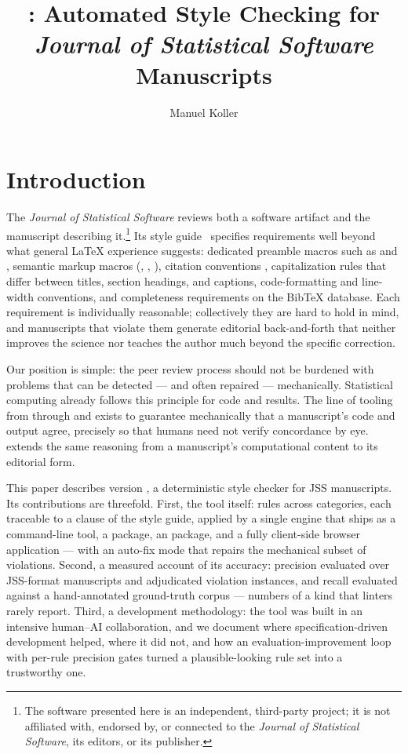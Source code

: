 \documentclass[nojss,article]{jss}
\author{Manuel Koller}
\title{\pkg{jss-lint}: Automated Style Checking for
  \emph{Journal of Statistical Software} Manuscripts}
\providecommand{\BibTeX}{Bib\TeX{}}
\begin{document}
\section{Introduction}
\label{sec:intro}

The \emph{Journal of Statistical Software} reviews both a software
artifact and the manuscript describing it.\footnote{The software presented
here is an independent, third-party project; it is not affiliated
with, endorsed by, or connected to the \emph{Journal of Statistical
Software}, its editors, or its publisher.} Its style
guide~\citep{jss_styleguide} specifies requirements well beyond what
general \LaTeX{} experience suggests: dedicated preamble macros such
as  and
, semantic markup macros
(, ,
),  citation conventions
\citep{natbib}, capitalization rules that differ between titles,
section headings, and captions, code-formatting and line-width
conventions, and completeness requirements on the \BibTeX{} database.
Each requirement is individually reasonable; collectively they are
hard to hold in mind, and manuscripts that violate them generate
editorial back-and-forth that neither improves the science nor teaches
the author much beyond the specific correction.

Our position is simple: the peer review process should not be burdened
with problems that can be detected --- and often repaired ---
mechanically. Statistical computing already follows this principle for
code and results. The line of tooling from 
\citep{leisch2002} through  \citep{xie2014} and
 \citep{sasweave} exists to guarantee mechanically that
a manuscript's code and output agree, precisely so that humans need
not verify concordance by eye.  extends the same
reasoning from a manuscript's computational content to its editorial
form.

This paper describes  version \StatToolVersion{}, a
deterministic style checker for JSS manuscripts. Its contributions are
threefold. First, the tool itself: \StatRuleCount{} rules across
\StatCategoryCount{} categories, each traceable to a clause of the
style guide, applied by a single  engine that ships as
a command-line tool, a  package, an 
package, and a fully client-side browser application --- with an
auto-fix mode that repairs the mechanical subset of violations.
Second, a measured account of its accuracy: precision evaluated over
\StatCorpusSize{} JSS-format manuscripts and \StatPrecisionReviewed{}
adjudicated violation instances, and recall evaluated against a
hand-annotated ground-truth corpus --- numbers of a kind that linters
rarely report. Third, a development methodology: the tool was built
in an intensive human--AI collaboration, and we document where
specification-driven development helped, where it did not, and how an
evaluation-improvement loop with per-rule precision gates turned a
plausible-looking rule set into a trustworthy one.
\end{document}
